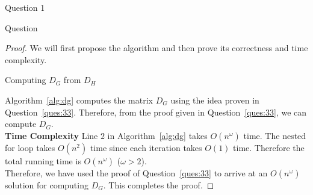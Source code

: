 \begin{solution}{Question 1}\label{ques:1}
    \begin{question}
        Question
    \end{question}
    \tcblower{}
    \begin{proof}
      We will first propose the algorithm and then prove its correctness and time complexity.
      \begin{algorithm}[H]
        \caption{Computing $D_G$ from $D_H$}\label{alg:dg}
        \begin{algorithmic}[1]
                \Else{}
                \EndIf{}
              \EndFor{}
            \EndFor{}
          \EndProcedure{}
        \end{algorithmic}
      \end{algorithm}
      Algorithm~\ref{alg:dg} computes the matrix $D_G$ using the idea proven in Question~\ref{ques:33}. Therefore, from the proof given in Question~\ref{ques:33}, we can compute $D_G$.\\
      \textbf{Time Complexity} Line $2$ in Algorithm~\ref{alg:dg} takes $O(n^\omega)$ time. The nested for loop takes $O(n^2)$ time since each iteration takes $O(1)$ time. Therefore the total running time is $O(n^\omega)$ ($\omega > 2$).\\
      Therefore, we have used the proof of Question~\ref{ques:33} to arrive at an $O(n^\omega)$ solution for computing $D_G$. This completes the proof.
    \end{proof}
\end{solution}
